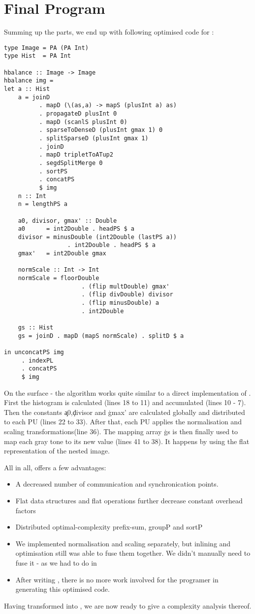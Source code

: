 \section{Final Program}
  Summing up the parts, we end up with following optimised code for \ndpv:
  \begin{lstlisting}
type Image = PA (PA Int)
type Hist  = PA Int

hbalance :: Image -> Image
hbalance img =
let a :: Hist
    a = joinD
          . mapD (\(as,a) -> mapS (plusInt a) as)
          . propagateD plusInt 0
          . mapD (scanlS plusInt 0)
          . sparseToDenseD (plusInt gmax 1) 0
          . splitSparseD (plusInt gmax 1)
          . joinD
          . mapD tripletToATup2
          . segdSplitMerge 0
          . sortPS
          . concatPS
          $ img
    n :: Int
    n = lengthPS a
    
    a0, divisor, gmax' :: Double
    a0      = int2Double . headPS $ a
    divisor = minusDouble (int2Double (lastPS a))
                  . int2Double . headPS $ a
    gmax'   = int2Double gmax
    
    normScale :: Int -> Int
    normScale = floorDouble
                      . (flip multDouble) gmax'
                      . (flip divDouble) divisor
                      . (flip minusDouble) a
                      . int2Double
      
    gs :: Hist
    gs = joinD . mapD (mapS normScale) . splitD $ a
    
in unconcatPS img
     . indexPL
     . concatPS
     $ img
  \end{lstlisting} %
  On the surface - the algorithm works quite similar to a direct
  implementation of \ndpn.
  First the histogram is calculated (lines 18 to 11) and accumulated (lines 10 - 7).
  Then the constants \c{a0},\c{divisor} and \c{gmax'} are calculated globally and distributed
  to each PU (lines 22 to 33). After that, each PU applies the normalisation and scaling transformations(line 36).
  The mapping array \c{gs} is then finally used to map
  each gray tone to its new value (lines 41 to 38). It happens by using the
  flat representation of the nested image.
  
  All in all, \ndpv offers a few advantages:
  \begin{itemize}
    \item A decreased number of communication and synchronication points.
    \item Flat data structures and flat operations further decrease constant overhead factors 
    \item Distributed optimal-complexity prefix-sum, groupP and sortP
    \item We implemented normalisation and scaling separately, but inlining
            and optimisation still was able to fuse them together. We didn't
            manually need to fuse it - as we had to do in \man
    \item After writing \ndpn, there is no more work involved for the programer in generating this optimised code.
  \end{itemize}
  Having transformed \ndpn into \ndpv, we are now ready to give a complexity analysis thereof.
  
